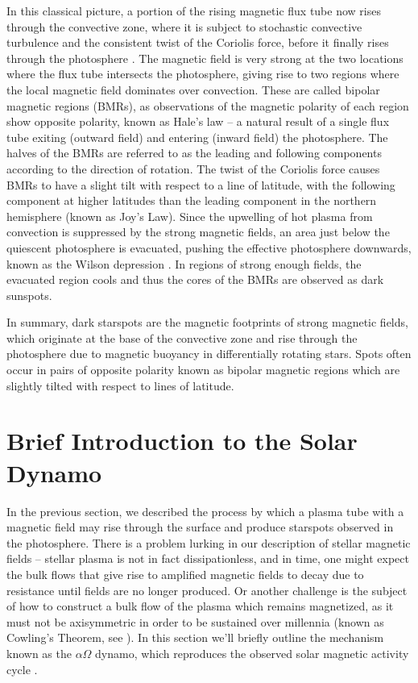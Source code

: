 In this classical picture, a portion of the rising magnetic flux tube now rises through the convective zone, where it is subject to stochastic convective turbulence and the consistent twist of the Coriolis force, before it finally rises through the photosphere \citep{Rempel2011, Cheung2014}. The magnetic field is very strong at the two locations where the flux tube intersects the photosphere, giving rise to two regions where the local magnetic field dominates over convection. These are called bipolar magnetic regions (BMRs), as observations of the magnetic polarity of each region show opposite polarity, known as Hale's law \citep{Hale1925} -- a natural result of a single flux tube exiting (outward field) and entering (inward field) the photosphere. The halves of the BMRs are referred to as the leading and following components according to the direction of rotation. The twist of the Coriolis force causes BMRs to have a slight tilt with respect to a line of latitude, with the following component at higher latitudes than the leading component in the northern hemisphere (known as Joy's Law). Since the upwelling of hot plasma from convection is suppressed by the strong magnetic fields, an area just below the quiescent photosphere is evacuated, pushing the effective photosphere downwards, known as the Wilson depression \citep{Wilson1774}. In regions of strong enough fields, the evacuated region cools and thus the cores of the BMRs are observed as dark sunspots. 

In summary, dark starspots are the magnetic footprints of strong magnetic fields, which originate at the base of the convective zone and rise through the photosphere due to magnetic buoyancy in differentially rotating stars. Spots often occur in pairs of opposite polarity known as bipolar magnetic regions which are slightly tilted with respect to lines of latitude.

\section{Brief Introduction to the Solar Dynamo} \label{sec:solardynamo}

In the previous section, we described the process by which a plasma tube with a magnetic field may rise through the surface and produce starspots observed in the photosphere. There is a problem lurking in our description of stellar magnetic fields -- stellar plasma is not in fact dissipationless, and in time, one might expect the bulk flows that give rise to amplified magnetic fields to decay due to resistance until fields are no longer produced. Or another challenge is the subject of how to construct a bulk flow of the plasma which remains magnetized, as it must not be axisymmetric in order to be sustained over millennia (known as Cowling's Theorem, see \citealt{Cowling1933}). In this section we'll briefly outline the mechanism known as the $\alpha  \Omega$ dynamo, which reproduces the observed solar magnetic activity cycle \citep{Hathaway2010, Charbonneau2014}. 

